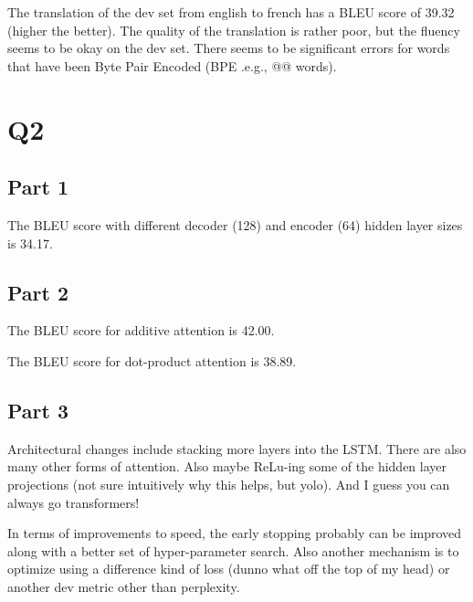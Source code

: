 \documentclass[11pt]{article}
\begin{document}
\bigskip

\noindent The translation of the dev set from english to french has a BLEU score of 39.32 (higher the better).
The quality of the translation is rather poor, but the fluency seems to be okay on the dev set.
There seems to be significant errors for words that have been Byte Pair Encoded (BPE .e.g., @@ words).

\section*{Q2}

\subsection*{Part 1}

The BLEU score with different decoder (128) and encoder (64) hidden layer sizes is 34.17.

\subsection*{Part 2}

The BLEU score for additive attention is 42.00.

\bigskip

\noindent The BLEU score for dot-product attention is 38.89.

\subsection*{Part 3}

Architectural changes include stacking more layers into the LSTM. There are also many other forms of attention. Also maybe ReLu-ing some
of the hidden layer projections (not sure intuitively why this helps, but yolo). And I guess you can always go transformers!

\bigskip

\noindent In terms of improvements to speed, the early stopping probably can be improved along with a better set of hyper-parameter search. Also
another mechanism is to optimize using a difference kind of loss (dunno what off the top of my head) or another dev metric other than perplexity.

\bigskip
\end{document}
